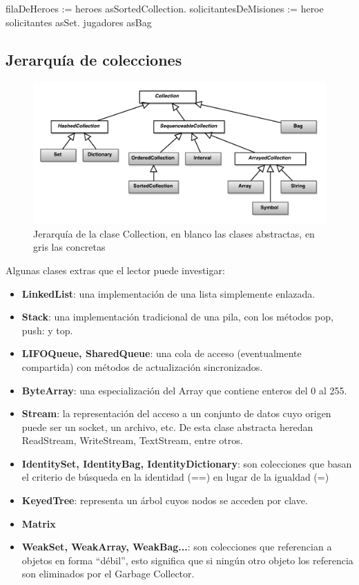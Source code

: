 \documentclass[a4paper,12pt]{book}
\begin{document}
\begin{code}
filaDeHeroes := heroes asSortedCollection.
solicitantesDeMisiones := heroe solicitantes asSet.
jugadores asBag
\end{code}

\subsection{Jerarquía de colecciones}

\begin{figure}[h!]
    \centering
    \includegraphics[width=1.1\textwidth]{images/50_JerarquiaColecciones.pdf}
    \caption{Jerarquía de la clase Collection, en blanco las clases abstractas, en gris las concretas}
\end{figure}
\FloatBarrier

Algunas clases extras que el lector puede investigar:

\begin{itemize}
 \item \textbf{LinkedList}: una implementación de una lista simplemente enlazada.
 \item \textbf{Stack}: una implementación tradicional de una pila, con los métodos pop, push: y top.
 \item \textbf{LIFOQueue, SharedQueue}: una cola de acceso (eventualmente compartida) con métodos
 de actualización sincronizados.
 \item \textbf{ByteArray}: una especialización del Array que contiene enteros del 0 al 255.
 \item \textbf{Stream}: la representación del acceso a un conjunto de datos cuyo origen puede ser un socket, un
 archivo, etc. De esta clase abstracta heredan ReadStream, WriteStream, TextStream, entre otros.
 \item \textbf{IdentitySet, IdentityBag, IdentityDictionary}: son colecciones que basan el criterio de búsqueda
 en la identidad (==) en lugar de la igualdad (=)
 \item \textbf{KeyedTree}: representa un árbol cuyos nodos se acceden por clave.
 \item \textbf{Matrix}
 \item \textbf{WeakSet, WeakArray, WeakBag...}: son colecciones que referencian a objetos en forma ``débil'',
 esto significa que si ningún otro objeto los referencia son eliminados por el Garbage Collector.
\end{itemize}
\end{document}
